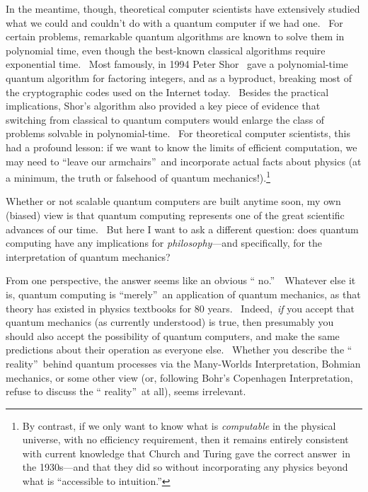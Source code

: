 \documentclass[12pt,onecolumn]{article}%
\begin{document}
In the meantime, though, theoretical computer scientists have extensively
studied what we could and couldn't do with a quantum computer if we had one.
\ For certain problems, remarkable quantum algorithms are known to solve them
in polynomial time, even though the best-known classical algorithms require
exponential time. \ Most famously, in 1994 Peter Shor \cite{shor}\ gave a
polynomial-time quantum algorithm for factoring integers, and as a byproduct,
breaking most of the cryptographic codes used on the Internet today. \ Besides
the practical implications, Shor's algorithm also provided a key piece of
evidence that switching from classical to quantum computers would enlarge the
class of problems solvable in polynomial-time. \ For theoretical computer
scientists, this had a profound lesson: if we want to know the limits of
efficient computation, we may need to \textquotedblleft leave our
armchairs\textquotedblright\ and incorporate actual facts about physics (at a
minimum, the truth or falsehood of quantum mechanics!).\footnote{By contrast,
if we only want to know what is \textit{computable} in the physical universe,
with no efficiency requirement, then it remains entirely consistent with
current knowledge that Church and Turing gave the correct answer\ in the
1930s---and that they did so without incorporating any physics beyond what is
\textquotedblleft accessible to intuition.\textquotedblright}

Whether or not scalable quantum computers are built anytime soon, my own
(biased) view is that quantum computing represents one of the great scientific
advances of our time. \ But here I want to ask a different question: does
quantum computing have any implications for \textit{philosophy}---and
specifically, for the interpretation of quantum mechanics?

From one perspective, the answer seems like an obvious \textquotedblleft
no.\textquotedblright\ \ Whatever else it is, quantum computing is
\textquotedblleft merely\textquotedblright\ an application of quantum
mechanics, as that theory has existed in physics textbooks for 80 years.
\ Indeed,\ \textit{if} you accept that quantum mechanics (as currently
understood) is true, then presumably you should also accept the possibility of
quantum computers, and make the same predictions about their operation as
everyone else. \ Whether you describe the \textquotedblleft
reality\textquotedblright\ behind quantum processes via the Many-Worlds
Interpretation, Bohmian mechanics, or some other view (or, following Bohr's
Copenhagen Interpretation, refuse to discuss the \textquotedblleft
reality\textquotedblright\ at all), seems irrelevant.
\end{document}
